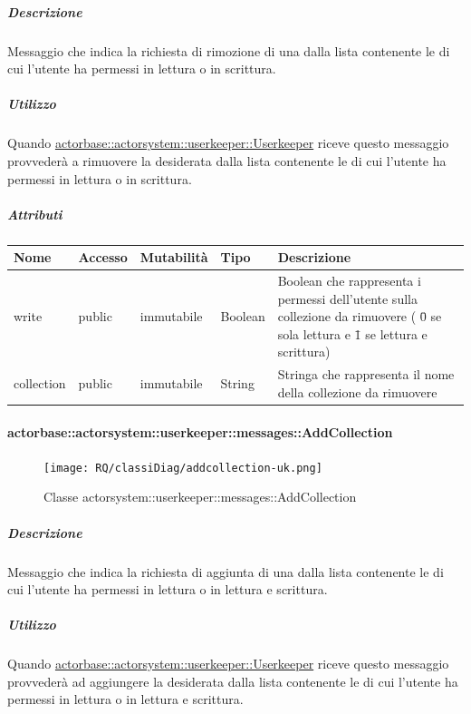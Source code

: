 \documentclass{scalatekids-article}
\begin{document}
\subparagraph{Descrizione}

Messaggio che indica la richiesta di rimozione di una  dalla
lista contenente le  di cui l'utente ha permessi in lettura
o in scrittura.

\subparagraph{Utilizzo}

Quando \hyperref[sec:actorbase::actorsystem::userkeeper::Userkeeper]{actorbase::\allowbreak{}actorsystem::\allowbreak{}userkeeper::\allowbreak{}Userkeeper}
riceve questo messaggio provvederà a rimuovere la  desiderata
dalla lista contenente le  di cui l'utente ha permessi in
lettura o in scrittura.

\subparagraph{Attributi}
\begin{tabular}{| p{3cm} | p{1.5cm} | p{2cm} | p{2cm} | p{8.5cm} |}
  \hline
  Nome & Accesso & Mutabilità & Tipo & Descrizione\\
  \hline
  write & public & immutabile & Boolean & Boolean che rappresenta i permessi dell'utente sulla collezione da rimuovere ( \=0 se sola lettura e \=1 se lettura e scrittura) \\
  \hline
  collection & public & immutabile & String & Stringa che rappresenta il nome della collezione da rimuovere \\
  \hline
\end{tabular}


\paragraph{actorbase::actorsystem::userkeeper::messages::AddCollection}
\label{sec:actorbase::actorsystem::userkeeper::messages::AddCollection}

\begin{figure}[H]
   \begin{center}
     \texttt{[image: RQ/classiDiag/addcollection-uk.png]}
     \caption{Classe actorsystem::userkeeper::messages::AddCollection}
   \end{center}
 \end{figure}

\subparagraph{Descrizione}

Messaggio che indica la richiesta di aggiunta di una  dalla
lista contenente le  di cui l'utente ha permessi in lettura
o in lettura e scrittura.

\subparagraph{Utilizzo}

Quando \hyperref[sec:actorbase::actorsystem::userkeeper::Userkeeper]{actorbase::\allowbreak{}actorsystem::\allowbreak{}userkeeper::\allowbreak{}Userkeeper}
riceve questo messaggio provvederà ad aggiungere la  desiderata
dalla lista contenente le  di cui l'utente ha permessi in
lettura o in lettura e scrittura.
\end{document}
